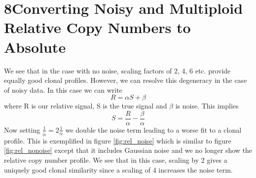 \documentclass[12pt]{article}\usepackage[]{graphicx}\usepackage[]{color}
\begin{document}
\newpage

\section*{8\quad Converting Noisy and Multiploid Relative Copy Numbers to Absolute}
We see that in the case with no noise, scaling factors of 2, 4, 6 etc. provide equally good clonal profiles. However, we can resolve this degeneracy in the case of noisy data. In this case we can write
\begin{equation*}
R = \alpha S + \beta
\end{equation*}
where R is our relative signal, S is the true signal and $\beta$ is noise. This implies
\begin{equation*}
S = \frac{R}{\alpha} - \frac{\beta}{\alpha}
\end{equation*}
Now setting $\frac{1}{\tilde{\alpha}} = 2\frac{1}{\alpha}$ we double the noise term leading to a worse fit to a clonal profile. This is exemplified in figure \ref{fig:rel_noise} which is similar to figure \ref{fig:rel_nonoise} except that it includes Gaussian noise and we no longer show the relative copy number profile. We see that in this case, scaling by 2 gives a uniquely good clonal similarity since a scaling of 4 increases the noise term.
\end{document}
